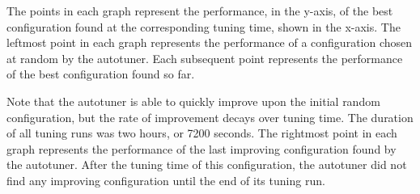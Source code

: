 The points in each graph represent the performance, in the y-axis, of the best
configuration found at the corresponding tuning time, shown in the x-axis. The
leftmost point in each graph represents the performance of a configuration
chosen at random by the autotuner. Each subsequent point represents the
performance of the best configuration found so far.

Note that the autotuner is able to quickly improve upon the initial random
configuration, but the rate of improvement decays over tuning time. The
duration of all tuning runs was two hours, or 7200 seconds.  The rightmost
point in each graph represents the performance of the last improving
configuration found by the autotuner. After the tuning time of this
configuration, the autotuner did not find any improving configuration until the
end of its tuning run.

